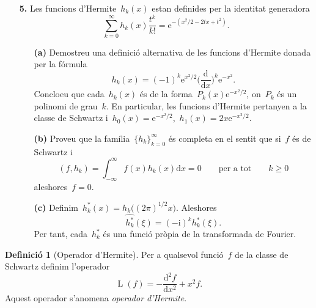 \documentclass[a4paper]{article}
\theoremstyle{plain}
\theoremstyle{definition}
\newtheorem{definition}{Definició}
\DeclareMathOperator{\Lop}{L}
\newcommand{\iu}{\mathrm{i}}
\newcommand{\e}{\mathrm{e}}
\providecommand{\uppi}{\pi}
\newcommand{\diff}{\mathrm{d}}
\begin{document}
\begin{enumerate}
    \item[\textbf{5.}] Les funcions d'Hermite~\(h_{k}(x)\) estan definides per
        la identitat generadora
        \[
            \sum_{k=0}^{\infty}
            h_{k}(x) \frac{t^{k}}{k!}
            =
            \e^{-(x^{2}/2 - 2tx+t^{2})}.
        \]
        \begin{enumerate}
            \item[\textbf{(a)}] Demostreu una definició alternativa de les
                funcions d'Hermite donada per la fórmula
                \[
                    h_{k}(x)
                    =
                    (-1)^{k} \e^{x^{2}/2}
                    \biggl(\frac{\diff}{\diff x}\biggr)^{k}
                    \e^{-x^{2}}.
                \]
                Concloeu que cada~\(h_{k}(x)\) és de la
                forma~\(P_{k}(x)\e^{-x^{2}/2}\), on~\(P_{k}\) és un polinomi de
                grau~\(k\).
                En particular, les funcions d'Hermite pertanyen a la classe de
                Schwartz i~\(h_{0}(x) =
                \e^{-x^{2}/2}\),~\(h_{1}(x)=2x\e^{-x^{2}/2}\).
        \end{enumerate}
\end{enumerate}

\begin{enumerate}
    \item[]\begin{enumerate}
        \item[\textbf{(b)}] Proveu que la família~\(\{h_{k}\}_{k=0}^{\infty}\)
            és completa en el sentit que si~\(f\) és de Schwartz i
            \[
                (f,h_{k}) = \int_{-\infty}^{\infty}f(x)h_{k}(x)\diff x = 0
                \qquad\text{per a tot}\qquad
                k\geq0
            \]
            aleshores~\(f=0\).
    \end{enumerate}
\end{enumerate}

\begin{enumerate}
    \item[]\begin{enumerate}
        \item[\textbf{(c)}]
            Definim~\(h^{\ast}_{k}(x)=h_{k}\bigl((2\uppi)^{1/2}x\bigr)\).
            Aleshores
            \[
                \widehat{h^{\ast}_{k}}(\xi) = (-\iu)^{k}h_{k}^{\ast}(\xi).
            \]
            Per tant, cada~\(h^{\ast}_{k}\) és una funció pròpia de la
            transformada de Fourier.
    \end{enumerate}
\end{enumerate}

\begin{definition}[Operador d'Hermite]
    Per a qualsevol funció~\(f\) de la classe de Schwartz definim l'operador
    \[
        \Lop(f) = -\frac{\diff^{2} f}{\diff x^{2}} + x^{2}f.
    \]
    Aquest operador s'anomena \emph{operador d'Hermite}.
\end{definition}
\end{document}
